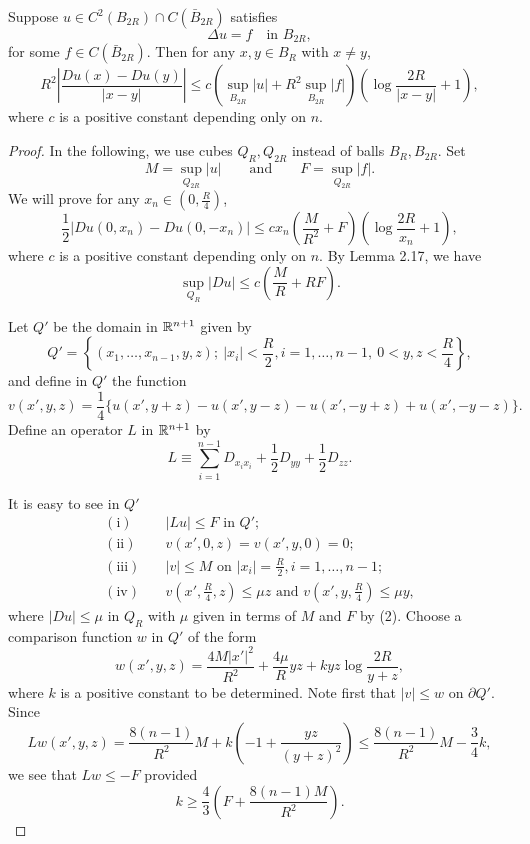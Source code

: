 \begin{lemma}\label{hanlin:poisson-lemma-2-18}
Suppose $u \in C^2(B_{2R}) \cap C(\bar B_{2R})$ satisfies
\[
\Delta u = f \quad \text{in } B_{2R},
\]
for some $f \in C(\bar B_{2R})$. Then for any $x,y \in B_R$ with $x \neq y$,
\[
R^2 \left|\frac{Du(x)-Du(y)}{|x-y|}\right| \le c \left(\sup_{B_{2R}} |u| + R^2 \sup_{B_{2R}} |f|\right)\left(\log \frac{2R}{|x-y|} + 1\right),
\]
where $c$ is a positive constant depending only on $n$.
\end{lemma}
\begin{proof}
\sketch
In the following, we use cubes $Q_R, Q_{2R}$ instead of balls $B_R, B_{2R}$. Set
\[
M = \sup_{Q_{2R}} |u| \qquad \text{and} \qquad F = \sup_{Q_{2R}} |f|.
\]
We will prove for any $x_n \in \left(0,\frac{R}{4}\right)$,
\begin{equation}
\frac{1}{2}|Du(0,x_n)-Du(0,-x_n)| \le c x_n \left(\frac{M}{R^2} + F\right)\left(\log \frac{2R}{x_n} + 1\right),
\tag{1}
\end{equation}
where $c$ is a positive constant depending only on $n$. By Lemma 2.17, we have
\begin{equation}
\sup_{Q_R} |Du| \le c\left(\frac{M}{R} + RF\right).
\tag{2}
\end{equation}

Let $Q'$ be the domain in $\mathbb{R}^{n+1}$ given by
\[
Q'=\left\{(x_1,\ldots,x_{n-1},y,z);\ |x_i|<\frac{R}{2}, i=1,\ldots,n-1,\ 0<y,z<\frac{R}{4}\right\},
\]
and define in $Q'$ the function
\[
v(x',y,z)=\frac{1}{4}\{u(x',y+z)-u(x',y-z)-u(x',-y+z)+u(x',-y-z)\}.
\]
Define an operator $L$ in $\mathbb{R}^{n+1}$ by
\[
L\equiv \sum_{i=1}^{n-1} D_{x_i x_i}+\frac{1}{2}D_{yy}+\frac{1}{2}D_{zz}.
\]

It is easy to see in $Q'$
\begin{align*}
(\mathrm{i})\quad &|Lu|\leq F \text{ in } Q';\\
(\mathrm{ii})\quad &v(x',0,z)=v(x',y,0)=0;\\
(\mathrm{iii})\quad &|v|\leq M \text{ on } |x_i|=\frac{R}{2}, i=1,\ldots,n-1;\\
(\mathrm{iv})\quad &v(x',\tfrac{R}{4},z)\leq \mu z \text{ and } v(x',y,\tfrac{R}{4})\leq \mu y,
\end{align*}
where $|Du|\leq \mu$ in $Q_R$ with $\mu$ given in terms of $M$ and $F$ by (2). Choose a comparison function $w$ in $Q'$ of the form
\[
w(x',y,z)=\frac{4M|x'|^2}{R^2}+\frac{4\mu}{R}yz+kyz\log\frac{2R}{y+z},
\]
where $k$ is a positive constant to be determined. Note first that $|v|\leq w$ on $\partial Q'$.
Since
\[
Lw(x',y,z)=\frac{8(n-1)}{R^2}M+k\left(-1+\frac{yz}{(y+z)^2}\right)\leq \frac{8(n-1)}{R^2}M-\frac{3}{4}k,
\]
we see that $Lw\leq -F$ provided
\[
k\geq \frac{4}{3}\left(F+\frac{8(n-1)M}{R^2}\right).
\]


\end{proof}
